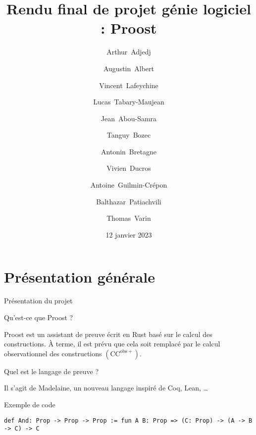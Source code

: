 \documentclass[12pt, aspectratio=169]{beamer}
\title[Rendu final : Proost]{Rendu final de projet génie logiciel : Proost}
\author[Projet génie logiciel]{
    \normalsize
    Arthur~Adjedj \and 
    Augustin~Albert \and
    Vincent~Lafeychine \and
    Lucas~Tabary-Maujean \and
    Jean~Abou-Samra \and
    Tanguy~Bozec \and
    Antonin~Bretagne \and
    Vivien~Ducros \and
    Antoine~Guilmin-Crépon \and
    Balthazar~Patiachvili \and
    Thomas~Varin
}
\date{12 janvier 2023}
\institute[]{ENS Paris-Saclay}
\begin{document}
    \beamertemplatenavigationsymbolsempty
    \maketitle

    \section{Présentation générale}

        \begin{frame}[fragile]{Présentation du projet}
        
            \begin{block}{Qu'est-ce que Proost ?}
                
                Proost est un assistant de preuve écrit en Rust basé sur le calcul des constructions. À terme, il est prévu que cela soit remplacé par le calcul observationnel des constructions $\left(\mathrm{CC}^{\mathrm{obs}+}\right)$.

            \end{block} \pause

            \begin{block}{Quel est le langage de preuve ?}
                
                Il s'agit de Madelaine, un nouveau langage inspiré de Coq, Lean, \dots

            \end{block} \pause

            \begin{exampleblock}{Exemple de code}
                
                \begin{lstlisting}[language=mdln]
                    def And: Prop -> Prop -> Prop := fun A B: Prop => (C: Prop) -> (A -> B -> C) -> C
                \end{lstlisting}

            \end{exampleblock}

        \end{frame}
\end{document}
